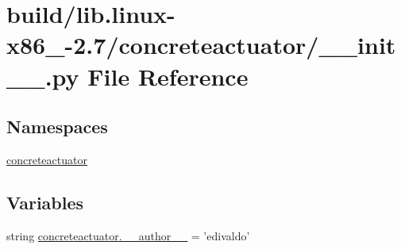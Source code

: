 \hypertarget{build_2lib_8linux-x86__64-2_87_2concreteactuator_2____init_____8py}{}\section{build/lib.linux-\/x86\+\_-\/2.7/concreteactuator/\+\_\+\+\_\+init\+\_\+\+\_\+.py File Reference}
\label{build_2lib_8linux-x86__64-2_87_2concreteactuator_2____init_____8py}
\subsection*{Namespaces}
\begin{DoxyCompactItemize}
\item 
 \hyperlink{namespaceconcreteactuator}{concreteactuator}
\end{DoxyCompactItemize}
\subsection*{Variables}
\begin{DoxyCompactItemize}
\item 
string \hyperlink{namespaceconcreteactuator_a28807ff8191a5ae5932b467167ed8ffc}{concreteactuator.\+\_\+\+\_\+author\+\_\+\+\_\+} = 'edivaldo'
\end{DoxyCompactItemize}
